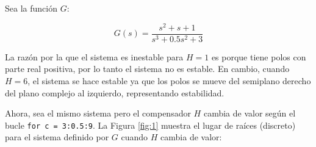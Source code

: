 Sea la función $G$:

\begin{equation}
    G(s) = \frac{s^2 + s + 1}{s^3 + 0.5s^2 + 3}
\end{equation}


La razón por la que el sistema es inestable para $H = 1$ es porque tiene polos con parte real positiva, por lo tanto el sistema no es estable. En cambio, cuando $H = 6$, el sistema se hace estable ya que los polos se mueve del semiplano derecho del plano complejo al izquierdo, representando estabilidad.

Ahora, sea el mismo sistema pero el compensador $H$ cambia de valor según el bucle \texttt{for c = 3:0.5:9}. La Figura \ref{fig:1} muestra el lugar de raíces (discreto) para el sistema definido por $G$ cuando $H$ cambia de valor:


